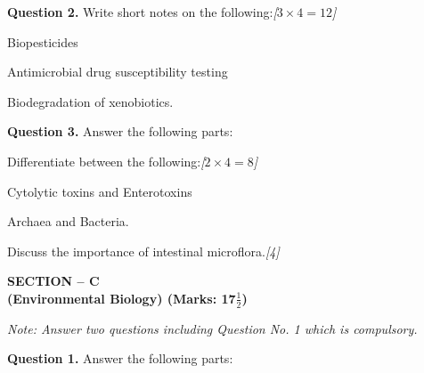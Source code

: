 \documentclass[11pt,a4paper]{article}
\newcommand{\pts}[1]{\hfill   \textit{[#1]}}
\begin{document}
\medskip


\noindent   \textbf{Question 2.} Write short notes on the following:\pts{$3  \times 4 = 12$}

\begin{parts}
  \item Biopesticides
  \item Antimicrobial drug susceptibility testing
  \item Biodegradation of xenobiotics.
\end{parts}

\medskip


\noindent   \textbf{Question 3.} Answer the following parts:

\begin{parts}
  \item Differentiate between the following:\pts{$2  \times 4 = 8$}
  
\begin{parts}
    \item Cytolytic toxins and Enterotoxins
    \item Archaea and Bacteria.
  \end{parts}
  \item Discuss the importance of intestinal microflora.\pts{4}
\end{parts}

\pagebreak

\begin{center}
   \textbf{SECTION -- C} \\
   \textbf{(Environmental Biology) (Marks: 17$\frac{1}{2}$)}
\end{center}

\smallskip



\noindent   \textit{Note: Answer two questions including Question No. 1 which is compulsory.}

\medskip


\noindent   \textbf{Question 1.} Answer the following parts:
\end{document}
